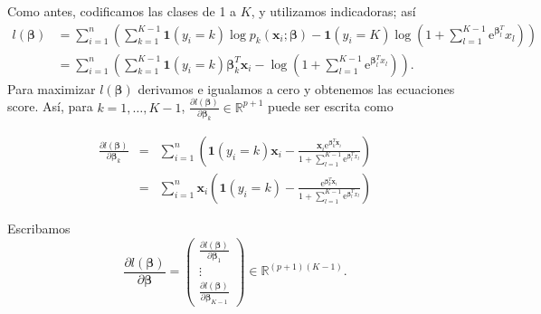 \documentclass{report}
\def\dst{\displaystyle}
\begin{document}
  Como antes, codificamos las clases de 1 a $K$, y utilizamos indicadoras; así 
  $$
  \begin{aligned}
  	l( \boldsymbol{\beta}) & =\sum_{i=1}^n\left(\sum_{k=1}^{K-1} \mathbf{1}\left(y_i=k\right) \log p_k\left(\mathbf{x}_i ;  \boldsymbol{ \boldsymbol{\beta}}\right)-\mathbf{1}\left(y_i=K\right) \log \left(1+\sum_{l=1}^{K-1} \text{e}^{ \boldsymbol{\beta}_l^T} x_l\right)\right) \\
  	& =\sum_{i=1}^n\left(\sum_{k=1}^{K-1} \mathbf{1}\left(y_i=k\right)  \boldsymbol{\beta}_k^T \mathbf{x}_i-\log \left(1+\sum_{l=1}^{K-1} \text{e}^{ \boldsymbol{\beta}_l^T x_l}\right)\right).
  \end{aligned}
  $$
  Para maximizar $	l( \boldsymbol{\beta})$ derivamos e igualamos a cero y obtenemos las ecuaciones score. Así,  para $k=1, \ldots, K-1$, $	\dst \frac{\partial l( \boldsymbol{\beta})}{\partial  \boldsymbol{\beta}_k} \in \mathbb{R}^{p+1}$ puede ser escrita como
  
  
  \begin{eqnarray}\label{derivpri}
  	\frac{\partial l( \boldsymbol{\beta})}{\partial  \boldsymbol{\beta}_k} & =&\sum_{i=1}^n\left(\mathbf{1}\left(y_i=k\right) \mathbf{x}_i-\frac{\mathbf{x}_i \text{e}^{ \boldsymbol{\beta}_k^T \mathbf{x}_i}}{1+\sum_{l=1}^{K-1} \text{e}^{ \boldsymbol{\beta}_l^T x_l}}\right) \nonumber \\
  	& =& \sum_{i=1}^n \mathbf{x}_i\left(\mathbf{1}\left(y_i=k\right)-\frac{\text{e}^{ \boldsymbol{\beta}_k^T \mathbf{x}_i}}{1+\sum_{l=1}^{K-1} \text{e}^{ \boldsymbol{\beta}_l^T x_l}}\right) 
  \end{eqnarray}
  
  
  Escribamos 
  $$
  \frac{\partial l( \boldsymbol{\beta})}{\partial  \boldsymbol{\beta}}=\left(\begin{array}{c}
  	\frac{\partial l( \boldsymbol{\beta})}{\partial  \boldsymbol{\beta}_1} \\
  	\vdots \\
  	\frac{\partial l( \boldsymbol{\beta})}{\partial  \boldsymbol{\beta}_{K-1}}
  \end{array}\right) \in \mathbb{R}^{(p+1)(K-1)} .
  $$
  
\end{document}
